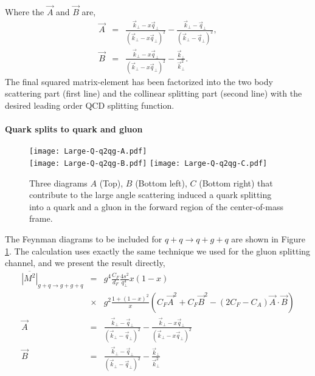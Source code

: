 \begin{appendices}
\begin{eqnarray}
\end{eqnarray}
Where the $\vec{A}$ and $\vec{B}$ are,
\begin{eqnarray}
\vec{A} &=& \frac{\vec{k}_\perp - x\vec{q}_\perp}{(\vec{k}_\perp - x\vec{q}_\perp)^2} -  \frac{\vec{k}_\perp - \vec{q}_\perp}{(\vec{k}_\perp - \vec{q}_\perp)^2}, \\
\vec{B} &=& \frac{\vec{k}_\perp - x\vec{q}_\perp}{(\vec{k}_\perp - x\vec{q}_\perp)^2} -  \frac{\vec{k}_\perp}{\vec{k}_\perp^2}.
\end{eqnarray}
The final squared matrix-element has been factorized into the two body scattering part (first line) and the collinear splitting part (second line) with the desired leading order QCD splitting function. 

\paragraph*{Quark splits to quark and gluon}
\begin{figure}
\singlespacing
\centering
\texttt{[image: Large-Q-q2qg-A.pdf]}\\
\vspace{1em}
\texttt{[image: Large-Q-q2qg-B.pdf]}\hfill
\texttt{[image: Large-Q-q2qg-C.pdf]}
\caption[Three diagrams $A$ (Top), $B$ (Bottom left), $C$ (Bottom right) that]{Three diagrams $A$ (Top), $B$ (Bottom left), $C$ (Bottom right) that contribute to the large angle scattering induced a quark splitting into a quark and a gluon in the forward region of the center-of-mass frame.}
\label{fig:feyn-q2qg}
\end{figure}

The Feynman diagrams to be included for $q+q\rightarrow q+g+q$ are shown in Figure \ref{fig:feyn-q2qg}.
The calculation uses exactly the same technique we used for the gluon splitting channel, and we present the result directly,
\begin{eqnarray}
\label{eq:qq2qgq}
\overline{|M^2|}_{g+q\rightarrow g+g+q} &=& 
 g^4 \frac{C_F}{d_F}\frac{4s^2}{q_\perp^4}x(1-x) \\\nonumber
&\times&g^2\frac{1+(1-x)^2}{x}  
\left(C_F\vec{A}^2 + C_F\vec{B}^2 - \left(2C_F-C_A\right)\vec{A}\cdot\vec{B}\right)\\
\vec{A} &=& \frac{\vec{k}_\perp - \vec{q}_\perp}{(\vec{k}_\perp - \vec{q}_\perp)^2} -  \frac{\vec{k}_\perp - x\vec{q}_\perp}{(\vec{k}_\perp - x\vec{q}_\perp)^2} \\
\vec{B} &=& \frac{\vec{k}_\perp - \vec{q}_\perp}{(\vec{k}_\perp - \vec{q}_\perp)^2} -  \frac{\vec{k}_\perp}{\vec{k}_\perp^2}
\end{eqnarray}



\end{appendices}
